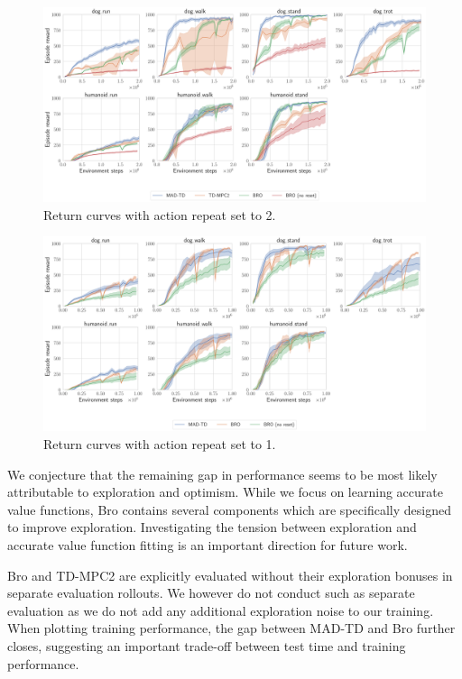 \begin{figure}[H]
    \centering
    \includegraphics[width=0.8\linewidth]{figures/mad-td/hard_all_fs_2.pdf}
    \caption{Return curves with action repeat set to 2.}
    \label{fig:hard_all_fs_2}
\end{figure}

\begin{figure}[H]
    \centering
    \includegraphics[width=0.8\linewidth]{figures/mad-td/hard_all_fs_1.pdf}
    \caption{Return curves with action repeat set to 1.}
    \label{fig:hard_all_fs_1}
\end{figure}

We conjecture that the remaining gap in performance seems to be most likely attributable to exploration and optimism.
While we focus on learning accurate value functions, Bro contains several components which are specifically designed to improve exploration.
Investigating the tension between exploration and accurate value function fitting is an important direction for future work.

Bro and TD-MPC2 are explicitly evaluated without their exploration bonuses in separate evaluation rollouts.
We however do not conduct such as separate evaluation as we do not add any additional exploration noise to our training.
When plotting training performance, the gap between MAD-TD and Bro further closes, suggesting an important trade-off between test time and training performance.


